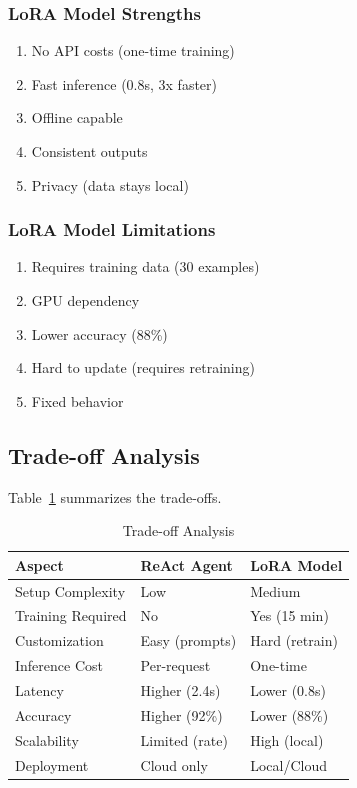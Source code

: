 \documentclass[runningheads]{llncs}
\begin{document}
\subsubsection{LoRA Model Strengths}
\begin{enumerate}
    \item No API costs (one-time training)
    \item Fast inference (0.8s, 3x faster)
    \item Offline capable
    \item Consistent outputs
    \item Privacy (data stays local)
\end{enumerate}

\subsubsection{LoRA Model Limitations}
\begin{enumerate}
    \item Requires training data (30 examples)
    \item GPU dependency
    \item Lower accuracy (88\%)
    \item Hard to update (requires retraining)
    \item Fixed behavior
\end{enumerate}

\subsection{Trade-off Analysis}

Table~\ref{tab:tradeoffs} summarizes the trade-offs.

\begin{table}[H]
\centering
\caption{Trade-off Analysis}
\label{tab:tradeoffs}
\begin{tabular}{@{}p{}p{}p{}@{}}
\toprule
Aspect & ReAct Agent & LoRA Model \\
\midrule
Setup Complexity & Low & Medium \\
Training Required & No & Yes (15 min) \\
Customization & Easy (prompts) & Hard (retrain) \\
Inference Cost & Per-request & One-time \\
Latency & Higher (2.4s) & Lower (0.8s) \\
Accuracy & Higher (92\%) & Lower (88\%) \\
Scalability & Limited (rate) & High (local) \\
Deployment & Cloud only & Local/Cloud \\
\bottomrule
\end{tabular}
\end{table}
\end{document}
